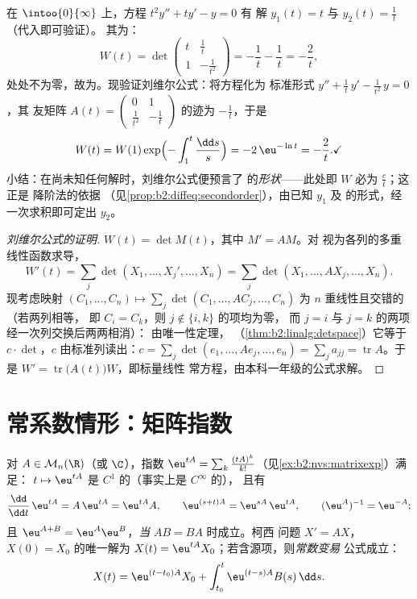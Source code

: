 \begin{example}[在欧拉方程上验证刘维尔公式]\label{ex:b2:diffeq:eulerwronskian}
在 $\intoo{0}{\infty}$ 上，方程 $t^2y'' + ty' - y = 0$ 有
解 $y_1(t) = t$ 与 $y_2(t) = \frac1t$（代入即可验证）。
其为：
\[
W(t) = \det\begin{pmatrix} t & \tfrac1t\\[2pt]
1 & -\tfrac{1}{t^2}\end{pmatrix}
= -\frac1t - \frac1t = -\frac2t ,
\]
处处不为零，故为。现验证刘维尔公式：将方程化为
标准形式 $y'' + \frac1t\,y' - \frac{1}{t^2}\,y = 0$，其
友矩阵 $A(t) = \begin{pmatrix} 0 & 1\\ \frac{1}{t^2}
& -\frac1t\end{pmatrix}$ 的迹为 $-\frac1t$，于是
\[
W(t) = W(1)\exp\Bigl(-\int_1^t\frac{\dd s}{s}\Bigr)
= -2\,\eu^{-\ln t} = -\frac2t . \checkmark
\]
小结：在尚未知任何解时，刘维尔公式便预言了
的\emph{形状}——此处即 $W$ 必为
$\frac{c}{t}$；这正是
降阶法的依据
（见\cref{prop:b2:diffeq:secondorder}），由已知 $y_1$ 及
的形式，经一次求积即可定出 $y_2$。
\end{example}

\begin{proof}[刘维尔公式的证明]
$W(t) = \det M(t)$，其中 $M' = AM$。对
视为各列的多重线性函数求导，
\[
W'(t) = \sum_j \det(X_1, \dots, X_j', \dots, X_n)
= \sum_j \det(X_1, \dots, AX_j, \dots, X_n) .
\]
现考虑映射 $(C_1, \dots, C_n) \mapsto \sum_j \det(C_1, \dots,
AC_j, \dots, C_n)$ 为 $n$ 重线性且交错的（若两列相等，
即 $C_i = C_k$，则 $j \notin \{i, k\}$ 的项均为零，
而 $j = i$ 与 $j = k$ 的两项经一次列交换后两两相消）：
由唯一性定理，
（\cref{thm:b2:linalg:detspace}）它等于 $c \cdot \det$，$c$
由标准列读出：$c = \sum_j \det(e_1, \dots, Ae_j, \dots,
e_n) = \sum_j a_{jj} = \operatorname{tr} A$。于是 $W' =
\operatorname{tr}\bigl(A(t)\bigr)W$，即标量线性
常方程，由本科一年级的公式求解。
\end{proof}

\section{常系数情形：矩阵指数}

\begin{theorem}\label{thm:b2:diffeq:matrixexp}
对 $A \in \mathcal{M}_n(\R)$（或 $\C$），指数 $\eu^{tA}
= \sum_k \frac{(tA)^k}{k!}$（见\cref{ex:b2:nvs:matrixexp}）满足：
$t \mapsto \eu^{tA}$ 是 $C^1$ 的（事实上是 $C^\infty$ 的），
且有
\[
\frac{\dd}{\dd t}\,\eu^{tA} = A\,\eu^{tA} = \eu^{tA}A ,
\qquad
\eu^{(s+t)A} = \eu^{sA}\,\eu^{tA},
\qquad
(\eu^{A})^{-1} = \eu^{-A} ;
\]
且 $\eu^{A + B} = \eu^A\eu^B$，\emph{当} $AB = BA$ 时成立。柯西
问题 $X' = AX$，$X(0) = X_0$ 的唯一解为 $X(t) =
\eu^{tA}X_0$；若含源项，则\emph{常数变易}
公式成立：
\[
X(t) = \eu^{(t - t_0)A}X_0 + \int_{t_0}^{t} \eu^{(t-s)A}B(s)\,\dd
s .
\]
\end{theorem}

